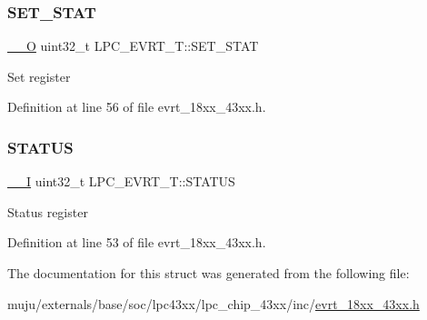 \subsubsection{\texorpdfstring{S\+E\+T\+\_\+\+S\+T\+AT}{SET\_STAT}}
{\footnotesize\ttfamily \hyperlink{core__sc300_8h_a7e25d9380f9ef903923964322e71f2f6}{\+\_\+\+\_\+O} uint32\+\_\+t L\+P\+C\+\_\+\+E\+V\+R\+T\+\_\+\+T\+::\+S\+E\+T\+\_\+\+S\+T\+AT}

Set register 

Definition at line 56 of file evrt\+\_\+18xx\+\_\+43xx.\+h.

\mbox{\label{struct_l_p_c___e_v_r_t___t_aec8df9a00928b61ccfc43f9ce347cf0e}} 
\subsubsection{\texorpdfstring{S\+T\+A\+T\+US}{STATUS}}
{\footnotesize\ttfamily \hyperlink{core__sc300_8h_af63697ed9952cc71e1225efe205f6cd3}{\+\_\+\+\_\+I} uint32\+\_\+t L\+P\+C\+\_\+\+E\+V\+R\+T\+\_\+\+T\+::\+S\+T\+A\+T\+US}

Status register 

Definition at line 53 of file evrt\+\_\+18xx\+\_\+43xx.\+h.



The documentation for this struct was generated from the following file\+:\begin{DoxyCompactItemize}
\item 
muju/externals/base/soc/lpc43xx/lpc\+\_\+chip\+\_\+43xx/inc/\hyperlink{evrt__18xx__43xx_8h}{evrt\+\_\+18xx\+\_\+43xx.\+h}\end{DoxyCompactItemize}
